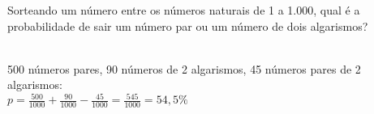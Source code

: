 \begin{ex}
Sorteando um número entre os números naturais de 1 a 1.000, qual é a probabilidade de sair um número par ou um número de dois algarismos?
  \begin{sol}
   \phantom{A} \\
   500 números pares, 90 números de 2 algarismos, 45 números pares de 2 algarismos: \\
   $p=\frac{500}{1000}+\frac{90}{1000}-\frac{45}{1000}=\frac{545}{1000}=54,5\%$
  \end{sol}
\end{ex}